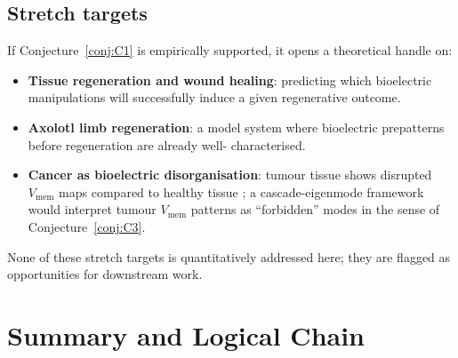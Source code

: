 \documentclass[12pt]{article}
\begin{document}
\subsection{Stretch targets}

If Conjecture~\ref{conj:C1} is empirically supported, it opens a
theoretical handle on:
\begin{itemize}
\item \textbf{Tissue regeneration and wound
  healing}: predicting which bioelectric manipulations will
  successfully induce a given regenerative outcome.
\item \textbf{Axolotl limb regeneration}: a model system where
  bioelectric prepatterns before regeneration are already well-
  characterised.
\item \textbf{Cancer as bioelectric
  disorganisation}: tumour tissue shows disrupted
  $V_{\mathrm{mem}}$ maps compared to healthy tissue
  \cite{Levin2021}; a cascade-eigenmode framework would interpret
  tumour $V_{\mathrm{mem}}$ patterns as ``forbidden'' modes in
  the sense of Conjecture~\ref{conj:C3}.
\end{itemize}
None of these stretch targets is quantitatively addressed here;
they are flagged as opportunities for downstream work.

\section{Summary and Logical Chain}\label{sec:chain}
\end{document}
